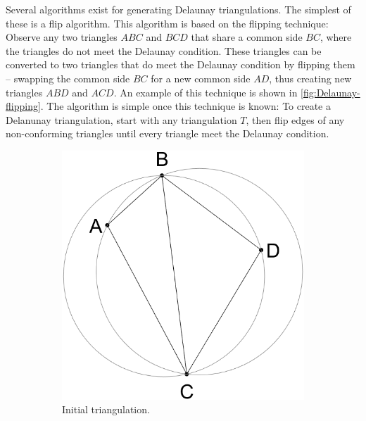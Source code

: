 Several algorithms exist for generating Delaunay triangulations. The simplest of these is a flip algorithm. This algorithm is based on the flipping technique: Observe any two triangles $ABC$ and $BCD$ that share a common side $BC$, where the triangles do not meet the Delaunay condition. These triangles can be converted to two triangles that do meet the Delaunay condition by flipping them -- swapping the common side $BC$ for a new common side $AD$, thus creating new triangles $ABD$ and $ACD$. An example of this technique is shown in \autoref{fig:Delaunay-flipping}. The algorithm is simple once this technique is known: To create a Delanunay triangulation, start with any triangulation $T$, then flip edges of any non-conforming triangles until every triangle meet the Delaunay condition.

\begin{figure}[ht]
    \centering
    \begin{subfigure}[b]{0.3\textwidth}
        \centering
        \includegraphics[width=\textwidth]{report/Images/Theory/delaunay-flipping/delaunay_flipping_initial.png}
        \caption{Initial triangulation.}
        \label{fig:delaunay-flipping-initial}
    \end{subfigure}
    \begin{subfigure}[b]{0.3\textwidth}
        \centering

\end{subfigure}
\end{figure}
